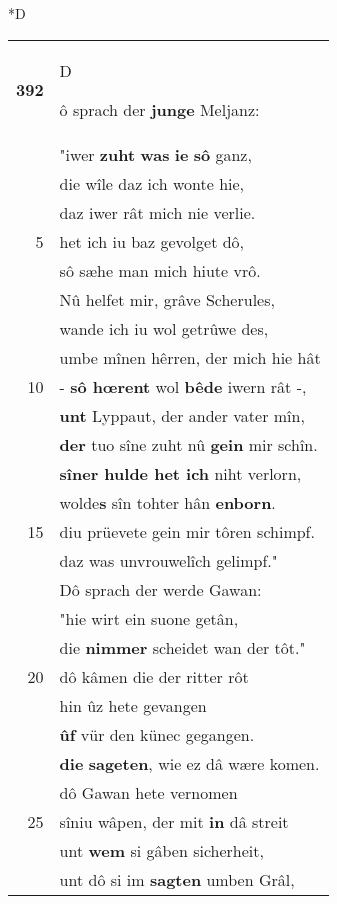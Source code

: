 \documentclass[8pt,a4paper,notitlepage]{article}
\begin{document}
\begin{table}[ht]
\begin{minipage}[t]{0.5\linewidth}
\small
\begin{center}*D
\end{center}
\begin{tabular}{rl}
\textbf{392} & \begin{large}D\end{large}ô sprach der \textbf{junge} Meljanz:\\ 
 & "iwer \textbf{zuht} \textbf{was} \textbf{ie} \textbf{sô} ganz,\\ 
 & die wîle daz ich wonte hie,\\ 
 & daz iwer rât mich nie verlie.\\ 
5 & het ich iu baz gevolget dô,\\ 
 & sô sæhe man mich hiute vrô.\\ 
 & Nû helfet mir, grâve Scherules,\\ 
 & wande ich iu wol getrûwe des,\\ 
 & umbe mînen hêrren, der mich hie hât\\ 
10 & - \textbf{sô hœrent} wol \textbf{bêde} iwern rât -,\\ 
 & \textbf{unt} Lyppaut, der ander vater mîn,\\ 
 & \textbf{der} tuo sîne zuht nû \textbf{gein} mir schîn.\\ 
 & \textbf{sîner hulde het ich} niht verlorn,\\ 
 & wolde\textbf{s} sîn tohter hân \textbf{enborn}.\\ 
15 & diu prüevete gein mir tôren schimpf.\\ 
 & daz was unvrouwelîch gelimpf."\\ 
 & Dô sprach der werde Gawan:\\ 
 & "hie wirt ein suone getân,\\ 
 & die \textbf{nimmer} scheidet wan der tôt."\\ 
20 & dô kâmen die der ritter rôt\\ 
 & hin ûz hete gevangen\\ 
 & \textbf{ûf} vür den künec gegangen.\\ 
 & \textbf{die} \textbf{sageten}, wie ez dâ wære komen.\\ 
 & dô Gawan hete vernomen\\ 
25 & sîniu wâpen, der mit \textbf{in} dâ streit\\ 
 & unt \textbf{wem} si gâben sicherheit,\\ 
 & unt dô si im \textbf{sagten} umben Grâl,\\ 

\end{tabular}
\end{minipage}
\end{table}
\end{document}
